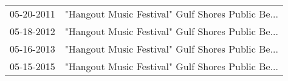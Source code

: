 \begin{supertabular}{ll}
 05-20-2011 &  "Hangout Music Festival" Gulf Shores Public Be... \\
 05-18-2012 &  "Hangout Music Festival" Gulf Shores Public Be... \\
 05-16-2013 &  "Hangout Music Festival" Gulf Shores Public Be... \\
 05-15-2015 &  "Hangout Music Festival" Gulf Shores Public Be... \\
\end{supertabular}
